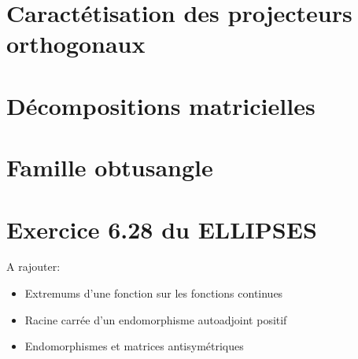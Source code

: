 \section{Caractétisation des projecteurs orthogonaux}


\section{Décompositions matricielles}


\section{Famille obtusangle}


\section{Exercice 6.28 du ELLIPSES}


A rajouter:
\begin{itemize}
    \item Extremums d'une fonction sur les fonctions continues
    \item Racine carrée d'un endomorphisme autoadjoint positif
    \item Endomorphismes et matrices antisymétriques
\end{itemize}